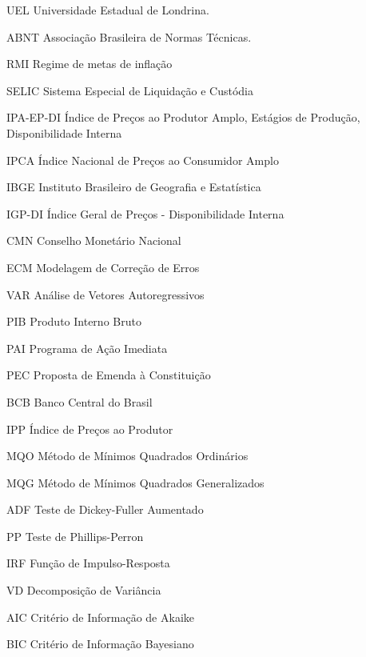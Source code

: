 \documentclass[12pt,oneside,a4paper,chapter=TITLE,english,brazil,sumario=abnt-6027-2012]{abntex2}
\begin{document}
\listoftables*
\cleardoublepage


\begin{siglas}
	\item[UEL] Universidade Estadual de Londrina. 
	\item[ABNT] Associação Brasileira de Normas Técnicas.
	\item[RMI] Regime de metas de inflação
	\item[SELIC] Sistema Especial de Liquidação e Custódia
	\item[IPA-EP-DI] Índice de Preços ao Produtor Amplo, Estágios de Produção, Disponibilidade Interna
	\item[IPCA] Índice Nacional de Preços ao Consumidor Amplo
	\item[IBGE] Instituto Brasileiro de Geografia e Estatística
	\item[IGP-DI] Índice Geral de Preços - Disponibilidade Interna
	\item[CMN] Conselho Monetário Nacional
	\item[ECM] Modelagem de Correção de Erros
	\item[VAR] Análise de Vetores Autoregressivos
	\item[PIB] Produto Interno Bruto
	\item[PAI] Programa de Ação Imediata
	\item[PEC] Proposta de Emenda à Constituição
	\item[BCB] Banco Central do Brasil
	\item[IPP] Índice de Preços ao Produtor
	\item[MQO] Método de Mínimos Quadrados Ordinários
	\item[MQG] Método de Mínimos Quadrados Generalizados
	\item[ADF] Teste de Dickey-Fuller Aumentado
	\item[PP] Teste de Phillips-Perron
	\item[IRF] Função de Impulso-Resposta
	\item[VD]  Decomposição de Variância
	\item[AIC] Critério de Informação de Akaike
	\item[BIC] Critério de Informação Bayesiano
\end{siglas}
\pagebreak


\end{document}

